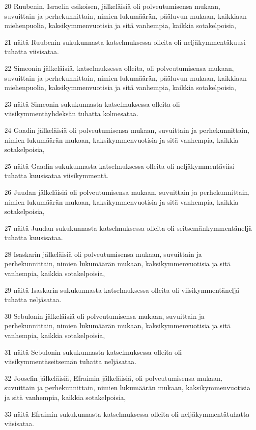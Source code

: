 \par 20 Ruubenin, Israelin esikoisen, jälkeläisiä oli polveutumisensa mukaan, suvuittain ja perhekunnittain, nimien lukumäärän, pääluvun mukaan, kaikkiaan miehenpuolia, kaksikymmenvuotisia ja sitä vanhempia, kaikkia sotakelpoisia,
\par 21 näitä Ruubenin sukukunnasta katselmuksessa olleita oli neljäkymmentäkuusi tuhatta viisisataa.
\par 22 Simeonin jälkeläisiä, katselmuksessa olleita, oli polveutumisensa mukaan, suvuittain ja perhekunnittain, nimien lukumäärän, pääluvun mukaan, kaikkiaan miehenpuolia, kaksikymmenvuotisia ja sitä vanhempia, kaikkia sotakelpoisia,
\par 23 näitä Simeonin sukukunnasta katselmuksessa olleita oli viisikymmentäyhdeksän tuhatta kolmesataa.
\par 24 Gaadin jälkeläisiä oli polveutumisensa mukaan, suvuittain ja perhekunnittain, nimien lukumäärän mukaan, kaksikymmenvuotisia ja sitä vanhempia, kaikkia sotakelpoisia,
\par 25 näitä Gaadin sukukunnasta katselmuksessa olleita oli neljäkymmentäviisi tuhatta kuusisataa viisikymmentä.
\par 26 Juudan jälkeläisiä oli polveutumisensa mukaan, suvuittain ja perhekunnittain, nimien lukumäärän mukaan, kaksikymmenvuotisia ja sitä vanhempia, kaikkia sotakelpoisia,
\par 27 näitä Juudan sukukunnasta katselmuksessa olleita oli seitsemänkymmentäneljä tuhatta kuusisataa.
\par 28 Isaskarin jälkeläisiä oli polveutumisensa mukaan, suvuittain ja perhekunnittain, nimien lukumäärän mukaan, kaksikymmenvuotisia ja sitä vanhempia, kaikkia sotakelpoisia,
\par 29 näitä Isaskarin sukukunnasta katselmuksessa olleita oli viisikymmentäneljä tuhatta neljäsataa.
\par 30 Sebulonin jälkeläisiä oli polveutumisensa mukaan, suvuittain ja perhekunnittain, nimien lukumäärän mukaan, kaksikymmenvuotisia ja sitä vanhempia, kaikkia sotakelpoisia,
\par 31 näitä Sebulonin sukukunnasta katselmuksessa olleita oli viisikymmentäseitsemän tuhatta neljäsataa.
\par 32 Joosefin jälkeläisiä, Efraimin jälkeläisiä, oli polveutumisensa mukaan, suvuittain ja perhekunnittain, nimien lukumäärän mukaan, kaksikymmenvuotisia ja sitä vanhempia, kaikkia sotakelpoisia,
\par 33 näitä Efraimin sukukunnasta katselmuksessa olleita oli neljäkymmentätuhatta viisisataa.
